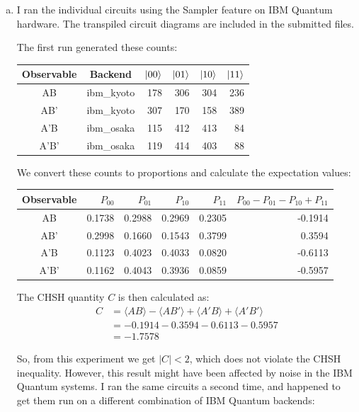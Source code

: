 \documentclass[12pt]{extarticle}
\begin{document}
\begin{enumerate}[(a)]
\item

I ran the individual circuits using the Sampler feature on IBM Quantum hardware.
The transpiled circuit diagrams are included in the submitted files.

The first run generated these counts:

\begin{center}
\begin{tabular}{|c|c|r|r|r|r|}
\hline
Observable & Backend & $\ket{00}$ & $\ket{01}$ & $\ket{10}$ & $\ket{11}$  \\
\hline
AB   & ibm\_kyoto & 178 & 306 & 304 & 236 \\
AB'  & ibm\_kyoto & 307 & 170 & 158 & 389 \\
A'B  & ibm\_osaka & 115 & 412 & 413 &  84 \\
A'B' & ibm\_osaka & 119 & 414 & 403 &  88 \\
\hline
\end{tabular}
\end{center}

We convert these counts to proportions and calculate the expectation values:

\begin{center}
\begin{tabular}{|c|r|r|r|r|r|}
\hline
Observable & $P_{00}$ & $P_{01}$ & $P_{10}$ & $P_{11}$ & $P_{00} - P_{01} - P_{10} + P_{11}$ \\
\hline
AB   & 0.1738 & 0.2988 & 0.2969 & 0.2305 & -0.1914 \\
AB'  & 0.2998 & 0.1660 & 0.1543 & 0.3799 &  0.3594 \\
A'B  & 0.1123 & 0.4023 & 0.4033 & 0.0820 & -0.6113 \\
A'B' & 0.1162 & 0.4043 & 0.3936 & 0.0859 & -0.5957 \\
\hline
\end{tabular}
\end{center}

The CHSH quantity $C$ is then calculated as:
\begin{align*}
C & = \langle AB \rangle - \langle AB' \rangle + \langle A'B \rangle + \langle A'B' \rangle \\
& = -0.1914 - 0.3594 - 0.6113 - 0.5957 \\
& = -1.7578
\end{align*}

So, from this experiment we get $|C|<2$, which does not violate the CHSH inequality.
However, this result might have been affected by noise in the IBM Quantum systems.
I ran the same circuits a second time, and happened to get them run on a different combination of IBM Quantum backends:


\end{enumerate}
\end{document}

